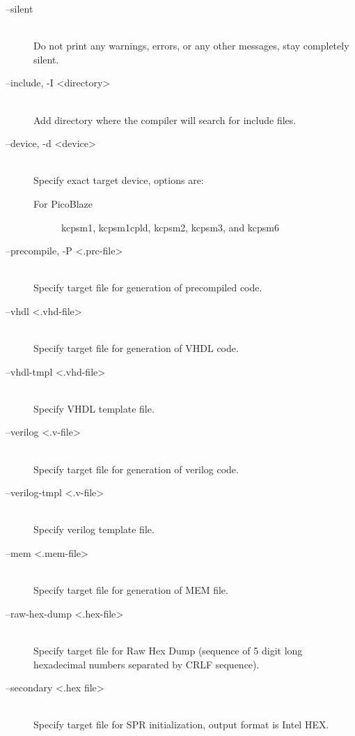 \begin{description}
            \item[--silent]~\\
                Do not print any warnings, errors, or any other messages, stay completely silent.

            \item[--include, -I <directory>]~\\
                Add directory where the compiler will search for include files.

            \item[--device, -d <device>]~\\
                Specify exact target device, options are:
                \begin{description}
                    \item[For PicoBlaze]
                        kcpsm1, kcpsm1cpld, kcpsm2, kcpsm3, and kcpsm6
                \end{description}

            \item[--precompile, -P <.prc-file>]~\\
                Specify target file for generation of precompiled code.

            \item[--vhdl <.vhd-file>]~\\
                Specify target file for generation of VHDL code.

            \item[--vhdl-tmpl <.vhd-file>]~\\
                Specify VHDL template file.

            \item[--verilog <.v-file>]~\\
                Specify target file for generation of verilog code.

            \item[--verilog-tmpl <.v-file>]~\\
                Specify verilog template file.

            \item[--mem <.mem-file>]~\\
                Specify target file for generation of MEM file.

            \item[--raw-hex-dump <.hex-file>]~\\
                Specify target file for Raw Hex Dump (sequence of 5 digit long hexadecimal numbers separated by CRLF sequence).

            \item[--secondary <.hex file>]~\\
                Specify target file for SPR initialization, output format is Intel HEX.
        \end{description}

